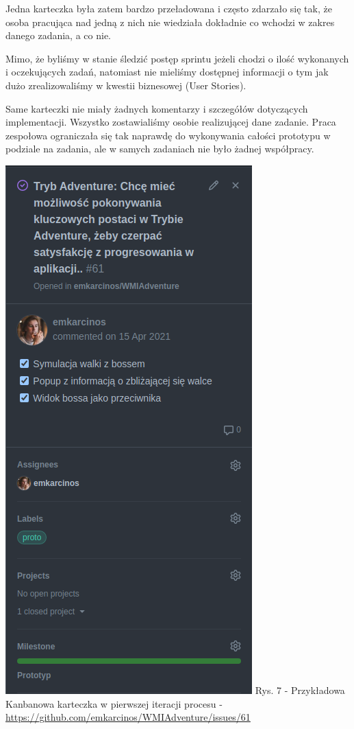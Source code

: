 \documentclass{article}
\begin{document}
Jedna karteczka była zatem bardzo przeładowana i często zdarzało się tak, że osoba pracująca nad jedną z nich nie wiedziała dokładnie co wchodzi w zakres danego zadania, a co nie.

Mimo, że byliśmy w stanie śledzić postęp sprintu jeżeli chodzi o ilość wykonanych i oczekujących zadań, natomiast nie mieliśmy dostępnej informacji o tym jak dużo zrealizowaliśmy w kwestii biznesowej (User Stories).

Same karteczki nie miały żadnych komentarzy i szczegółów dotyczących implementacji. Wszystko zostawialiśmy osobie realizującej dane zadanie. Praca zespołowa ograniczała się tak naprawdę do wykonywania całości prototypu w podziale na zadania, ale w samych zadaniach nie było żadnej współpracy.

\begin{center}
    \includegraphics[scale=0.7]{card_initial_example.png}
    \newline
    Rys. 7 - Przykładowa Kanbanowa karteczka w pierwszej iteracji procesu - \url{https://github.com/emkarcinos/WMIAdventure/issues/61}
\end{center}
\end{document}
